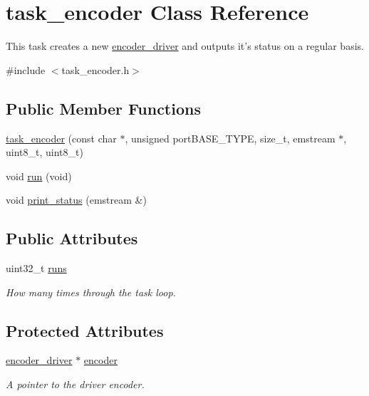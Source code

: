 \hypertarget{classtask__encoder}{\section{task\-\_\-encoder \-Class \-Reference}
\label{classtask__encoder}
}


\-This task creates a new \hyperlink{classencoder__driver}{encoder\-\_\-driver} and outputs it's status on a regular basis.  




{\ttfamily \#include $<$task\-\_\-encoder.\-h$>$}

\subsection*{\-Public \-Member \-Functions}
\begin{DoxyCompactItemize}
\item 
\hyperlink{classtask__encoder_a86aac760167b1b7d59840270a9365711}{task\-\_\-encoder} (const char $\ast$, unsigned port\-B\-A\-S\-E\-\_\-\-T\-Y\-P\-E, size\-\_\-t, emstream $\ast$, uint8\-\_\-t, uint8\-\_\-t)
\item 
void \hyperlink{classtask__encoder_a8380b1f111bf5d6b4256f16e355c0afc}{run} (void)
\item 
void \hyperlink{classtask__encoder_a5006f06f253b70cfec10065d67e52ec6}{print\-\_\-status} (emstream \&)
\end{DoxyCompactItemize}
\subsection*{\-Public \-Attributes}
\begin{DoxyCompactItemize}
\item 
\hypertarget{classtask__encoder_a1730c64a9c2fb9eacf549929071ab2c5}{uint32\-\_\-t \hyperlink{classtask__encoder_a1730c64a9c2fb9eacf549929071ab2c5}{runs}}\label{classtask__encoder_a1730c64a9c2fb9eacf549929071ab2c5}

\begin{DoxyCompactList}\small\item\em \-How many times through the task loop. \end{DoxyCompactList}\end{DoxyCompactItemize}
\subsection*{\-Protected \-Attributes}
\begin{DoxyCompactItemize}
\item 
\hypertarget{classtask__encoder_ac6a3245667614f1ffab6fd035bb89144}{\hyperlink{classencoder__driver}{encoder\-\_\-driver} $\ast$ \hyperlink{classtask__encoder_ac6a3245667614f1ffab6fd035bb89144}{encoder}}\label{classtask__encoder_ac6a3245667614f1ffab6fd035bb89144}

\begin{DoxyCompactList}\small\item\em \-A pointer to the driver encoder. \end{DoxyCompactList}\end{DoxyCompactItemize}


